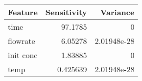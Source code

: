 \begin{longtable}{lrr}
\hline
 Feature   &   Sensitivity &    Variance \\
\hline
 time      &     97.1785   & 0           \\
 flowrate  &      6.05278  & 2.01948e-28 \\
 init conc &      1.83885  & 0           \\
 temp      &      0.425639 & 2.01948e-28 \\
\hline
\end{longtable}
